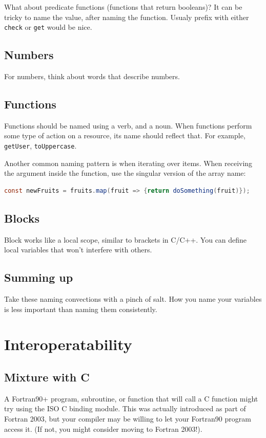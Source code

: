 \documentclass[11pt]{book} %
\begin{document}
What about predicate functions (functions that return booleans)? It can be tricky to name the value, after naming the function. Usualy prefix with either \verb|check| or \verb|get| would be nice.

\subsection{Numbers}

For numbers, think about words that describe numbers.

\subsection{Functions}

Functions should be named using a verb, and a noun. When functions perform some type of action on a resource, its name should reflect that. For example, \verb|getUser|, \verb|toUppercase|.

Another common naming pattern is when iterating over items. When receiving the argument inside the function, use the singular version of the array name:
\begin{lstlisting}[language=java, caption=Iterating over items]
const newFruits = fruits.map(fruit => {return doSomething(fruit)});
\end{lstlisting}

\subsection{Blocks}

Block works like a local scope, similar to brackets in C/C++. You can define local variables that won't interfere with others.

\subsection{Summing up}
Take these naming convections with a pinch of salt. How you name your variables is less important than naming them consistently.

\section{Interoperatability}

\subsection{Mixture with C}
A Fortran90+ program, subroutine, or function that will call a C function might try using the ISO C binding module. This was actually introduced as part of Fortran 2003, but your compiler may be willing to let your Fortran90 program access it. (If not, you might consider moving to Fortran 2003!). 
\end{document}

